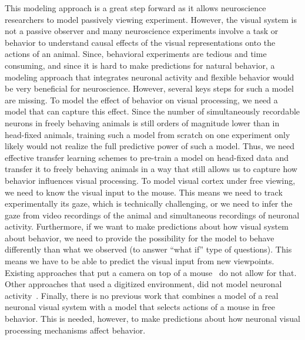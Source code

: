 \documentclass[B2,COG]{ercgrant}
\begin{document}
This modeling approach is a great step forward as it allows neuroscience researchers to model passively viewing experiment. 
However, the visual system is not a passive observer and many neuroscience experiments involve a task or behavior to understand causal effects of the visual representations onto the actions of an animal. 
Since, behavioral experiments are tedious and time consuming, and since it is hard to make predictions for natural behavior, a modeling approach that integrates neuronal activity and flexible behavior would be very beneficial for neuroscience. 
However, several keys steps for such a model are missing. 
To model the effect of behavior on visual processing, we need a model that can capture this effect. 
Since the number of simultaneously recordable neurons in freely behaving animals is still orders of magnitude lower than in head-fixed animals, training such a model from scratch on one experiment only likely would not realize the full predictive power of such a model. 
Thus, we need effective transfer learning schemes to pre-train a model on head-fixed data and transfer it to freely behaving animals in a way that still allows us to capture how behavior influences visual processing. 
To model visual cortex under free viewing, we need to know the visual input to the mouse. 
This means we need to track experimentally its gaze, which is technically challenging, or we need to infer the gaze from video recordings of the animal and simultaneous recordings of neuronal activity. 
Furthermore, if we want to make predictions about how visual system about behavior, we need to provide the possibility for the model to behave differently than what we observed (to answer ``what if'' type of questions). 
This means we have to be able to predict the visual input from new viewpoints.
Existing approaches that put a camera on top of a mouse~\parencite{Parker2022-ac} do not allow for that. 
Other approaches that used a digitized environment, did not model neuronal activity~\parencite{Holmgren2021-jv}.
Finally, there is no previous work that combines a model of a real neuronal visual system with a model that selects actions of a mouse in free behavior. 
This is needed, however, to make predictions about how neuronal visual processing mechanisms affect behavior. 

\end{document}
